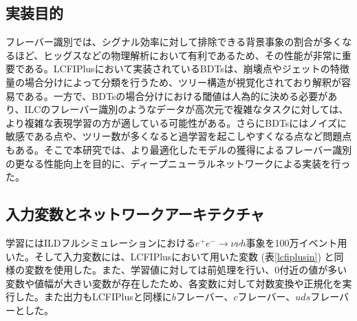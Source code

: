 \subsection{実装目的}
フレーバー識別では、シグナル効率に対して排除できる背景事象の割合が多くなるほど、ヒッグスなどの物理解析において有利であるため、その性能が非常に重要である。LCFIPlusにおいて実装されているBDTsは、崩壊点やジェットの特徴量の場合分けによって分類を行うため、ツリー構造が視覚化されており解釈が容易である。一方で、BDTsの場合分けにおける閾値は人為的に決める必要があり、ILCのフレーバー識別のようなデータが高次元で複雑なタスクに対しては、より複雑な表現学習の方が適している可能性がある。さらにBDTsにはノイズに敏感である点や、ツリー数が多くなると過学習を起こしやすくなる点など問題点もある。そこで本研究では、より最適化したモデルの獲得によるフレーバー識別の更なる性能向上を目的に、ディープニューラルネットワークによる実装を行った。
\subsection{入力変数とネットワークアーキテクチャ}
学習にはILDフルシミュレーションにおける$e^+ e^- \rightarrow \nu\nu h$事象を100万イベント用いた。そして入力変数には、LCFIPlusにおいて用いた変数 (表\ref{lcfiplusin}) と同様の変数を使用した。また、学習値に対しては前処理を行い、0付近の値が多い変数や値幅が大きい変数が存在したため、各変数に対して対数変換や正規化を実行した。また出力もLCFIPlusと同様に$b$フレーバー、$c$フレーバー、$uds$フレーバーとした。

